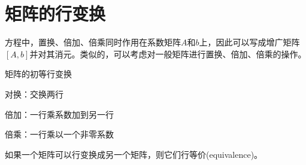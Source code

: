 \section{矩阵的行变换}
方程中，置换、倍加、倍乘同时作用在系数矩阵$A$和$b$上，因此可以写成增广矩阵$[A,b]$并对其消元。类似的，可以考虑对一般矩阵进行置换、倍加、倍乘的操作。
\begin{definition}{矩阵的初等行变换}{}
	\begin{compactitem}
		\item 对换：交换两行
		\item 倍加：一行乘系数加到另一行
		\item 倍乘：一行乘以一个非零系数
	\end{compactitem}
\end{definition}
如果一个矩阵可以行变换成另一个矩阵，则它们行等价(equivalence)。

